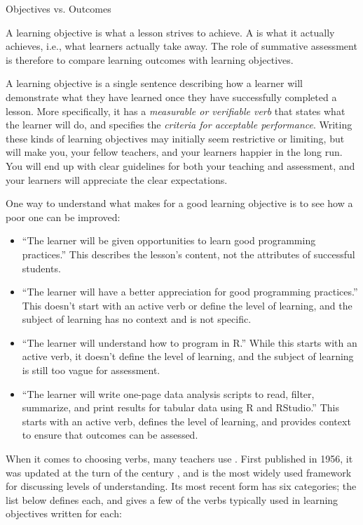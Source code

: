 \begin{aside}{Objectives vs. Outcomes}

A learning objective is what a lesson strives to achieve. A
 is what it actually
achieves, i.e., what learners actually take away. The role of
summative assessment is therefore to compare learning outcomes with
learning objectives.

\end{aside}

A learning objective is a single sentence describing how a learner
will demonstrate what they have learned once they have successfully
completed a lesson. More specifically, it has a \emph{measurable or
verifiable verb} that states what the learner will do, and specifies
the \emph{criteria for acceptable performance}. Writing these kinds of
learning objectives may initially seem restrictive or limiting, but
will make you, your fellow teachers, and your learners happier in the
long run. You will end up with clear guidelines for both your teaching
and assessment, and your learners will appreciate the clear
expectations.

One way to understand what makes for a good learning objective is to
see how a poor one can be improved:

\begin{itemize}
\item
  ``The learner will be given opportunities to learn good programming
  practices.'' This describes the lesson's content, not the attributes
  of successful students.
\item
  ``The learner will have a better appreciation for good programming
  practices.'' This doesn't start with an active verb or define the
  level of learning, and the subject of learning has no context and is
  not specific.
\item
  ``The learner will understand how to program in R.'' While this starts
  with an active verb, it doesn't define the level of learning, and
  the subject of learning is still too vague for assessment.
\item
  ``The learner will write one-page data analysis scripts to read,
  filter, summarize, and print results for tabular data using R and
  RStudio.'' This starts with an active verb, defines the level of
  learning, and provides context to ensure that outcomes can be
  assessed.
\end{itemize}

When it comes to choosing verbs, many teachers use . First published in 1956, it
was updated at the turn of the century \cite{Ande2001}, and is the
most widely used framework for discussing levels of understanding. Its
most recent form has six categories; the list below defines each, and
gives a few of the verbs typically used in learning objectives written
for each:

